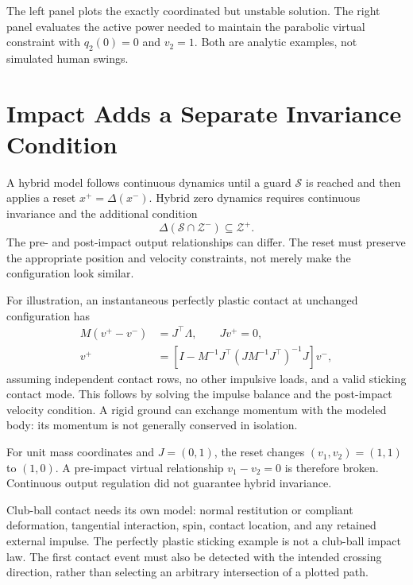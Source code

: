 \documentclass[12pt, openany]{book}
\theoremstyle{plain}
\begin{document}
The left panel plots the exactly coordinated but unstable solution. The right panel evaluates the active power needed to maintain the parabolic virtual constraint with $q_2(0)=0$ and $v_2=1$. Both are analytic examples, not simulated human swings.

\section{Impact Adds a Separate Invariance Condition}

A hybrid model follows continuous dynamics until a guard $\mathcal S$ is reached and then applies a reset $x^+=\Delta(x^-)$. Hybrid zero dynamics requires continuous invariance and the additional condition
\begin{equation}
\Delta(\mathcal S\cap\mathcal Z^-)\subseteq\mathcal Z^+ .
\end{equation}
The pre- and post-impact output relationships can differ. The reset must preserve the appropriate position and velocity constraints, not merely make the configuration look similar.

For illustration, an instantaneous perfectly plastic contact at unchanged configuration has
\begin{equation}
\begin{aligned}
M(v^+-v^-)&=J^\top\Lambda,\qquad Jv^+=0,\\
v^+&=\left[I-M^{-1}J^\top(JM^{-1}J^\top)^{-1}J\right]v^- ,
\end{aligned}
\end{equation}
assuming independent contact rows, no other impulsive loads, and a valid sticking contact mode. This follows by solving the impulse balance and the post-impact velocity condition. A rigid ground can exchange momentum with the modeled body: its momentum is not generally conserved in isolation.

For unit mass coordinates and $J=(0,1)$, the reset changes $(v_1,v_2)=(1,1)$ to $(1,0)$. A pre-impact virtual relationship $v_1-v_2=0$ is therefore broken. Continuous output regulation did not guarantee hybrid invariance.

Club-ball contact needs its own model: normal restitution or compliant deformation, tangential interaction, spin, contact location, and any retained external impulse. The perfectly plastic sticking example is not a club-ball impact law. The first contact event must also be detected with the intended crossing direction, rather than selecting an arbitrary intersection of a plotted path.
\end{document}
